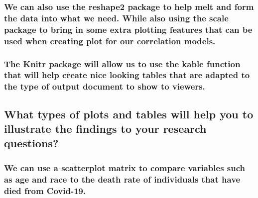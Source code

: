 \documentclass[
]{article}
\begin{document}
\hypertarget{we-can-also-use-the-reshape2-package-to-help-melt-and-form-the-data-into-what-we-need.-while-also-using-the-scale-package-to-bring-in-some-extra-plotting-features-that-can-be-used-when-creating-plot-for-our-correlation-models.}{%
\subsubsection{We can also use the reshape2 package to help melt and
form the data into what we need. While also using the scale package to
bring in some extra plotting features that can be used when creating
plot for our correlation
models.}\label{we-can-also-use-the-reshape2-package-to-help-melt-and-form-the-data-into-what-we-need.-while-also-using-the-scale-package-to-bring-in-some-extra-plotting-features-that-can-be-used-when-creating-plot-for-our-correlation-models.}}

\hypertarget{the-knitr-package-will-allow-us-to-use-the-kable-function-that-will-help-create-nice-looking-tables-that-are-adapted-to-the-type-of-output-document-to-show-to-viewers.}{%
\subsubsection{The Knitr package will allow us to use the kable function
that will help create nice looking tables that are adapted to the type
of output document to show to
viewers.}\label{the-knitr-package-will-allow-us-to-use-the-kable-function-that-will-help-create-nice-looking-tables-that-are-adapted-to-the-type-of-output-document-to-show-to-viewers.}}

\hypertarget{what-types-of-plots-and-tables-will-help-you-to-illustrate-the-uxfb01ndings-to-your-research-questions}{%
\subsection{What types of plots and tables will help you to illustrate
the ﬁndings to your research
questions?}\label{what-types-of-plots-and-tables-will-help-you-to-illustrate-the-uxfb01ndings-to-your-research-questions}}

\hypertarget{we-can-use-a-scatterplot-matrix-to-compare-variables-such-as-age-and-race-to-the-death-rate-of-individuals-that-have-died-from-covid-19.}{%
\subsubsection{We can use a scatterplot matrix to compare variables such
as age and race to the death rate of individuals that have died from
Covid-19.}\label{we-can-use-a-scatterplot-matrix-to-compare-variables-such-as-age-and-race-to-the-death-rate-of-individuals-that-have-died-from-covid-19.}}
\end{document}
